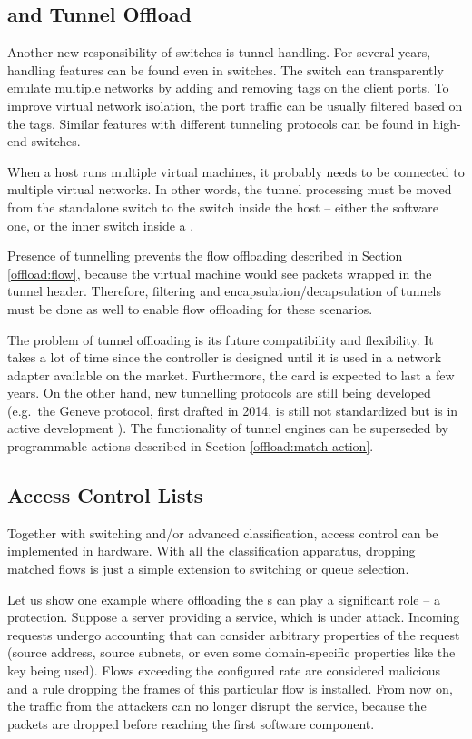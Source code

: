\subsection{ and Tunnel Offload}

Another new responsibility of switches is tunnel handling. For several years, -handling
features can be found even in  switches. The switch can
transparently emulate multiple networks by adding and removing  tags on
the client ports. To improve virtual network isolation, the port traffic
can be usually filtered based on the  tags. Similar features with different
tunneling protocols can be found in high-end switches.

When a host runs multiple virtual machines, it probably needs to be connected
to multiple virtual networks. In other words, the tunnel processing must be
moved from the standalone switch to the switch inside the host -- either the
software one, or the inner switch inside a .

Presence of tunnelling prevents the flow offloading described in Section \ref{offload:flow},
because the virtual machine would see packets wrapped in the tunnel header.
Therefore, filtering and encapsulation/decapsulation of
tunnels must be done as well to enable flow offloading for these scenarios.

The problem of tunnel offloading is its future compatibility and flexibility.
It takes a lot of time since the controller is designed until it is used in
a network adapter available on the market. Furthermore, the card is expected to
last a few years. On the other hand, new tunnelling protocols are still being
developed (e.g.\ the Geneve protocol, first drafted in 2014, is still not
standardized but is in active development \cite{ietf-nvo3-geneve-06}). The
functionality of tunnel engines can be superseded by programmable actions
described in Section \ref{offload:match-action}.

\subsection{Access Control Lists}

Together with switching and/or advanced classification, access control can
be implemented in hardware. With all the classification apparatus, dropping
matched flows is just a simple extension to switching or queue selection.

Let us show one example where offloading the s can play a significant
role -- a  protection. Suppose a server providing a service, which is
under  attack. Incoming requests undergo accounting that can consider
arbitrary properties of the request (source address, source subnets, or even
some domain-specific properties like the  key being used). Flows
exceeding the configured rate are considered malicious and a rule dropping the
frames of this particular flow is installed. From now on, the traffic from the
attackers can no longer disrupt the service, because the packets are dropped
before reaching the first software component.

